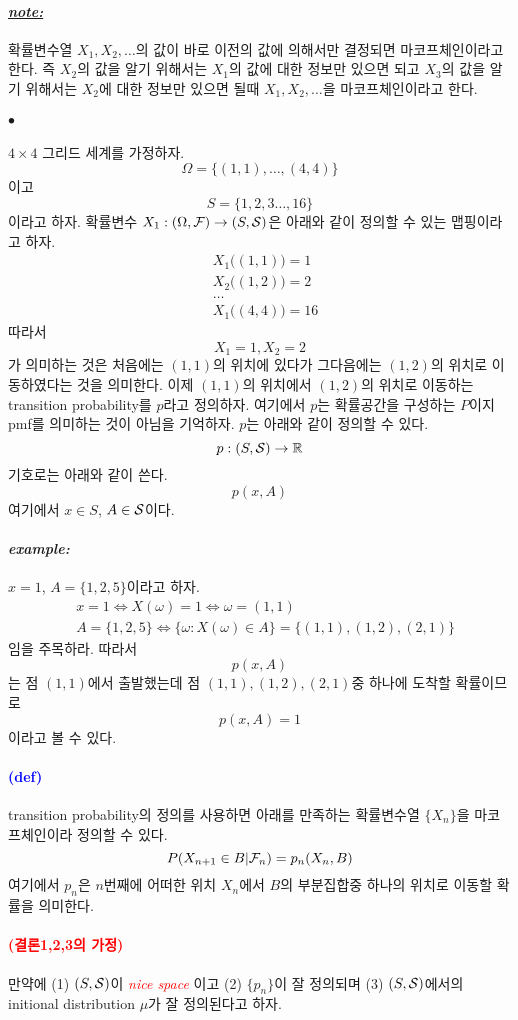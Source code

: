 \documentclass[12pt,oneside,english]{book}
\def\ck{\paragraph{\Large$\bullet$}\Large}
\def\note{\paragraph{\Large\textit{\underline{note:}}}\Large}
\def\ex{\paragraph{\Large\textit{example:}}\Large}
\newcommand{\parablue}[1]{\paragraph{\Large\textcolor{blue}{(#1)}}\Large}
\newcommand{\parared}[1]{\paragraph{\Large\textcolor{red}{(#1)}}\Large}
\begin{document}
\note 확률변수열 $X_1,X_2,\dots$의 값이 바로 이전의 값에 의해서만 결정되면 마코프체인이라고 한다. 즉 $X_2$의 값을 알기 위해서는 $X_1$의 값에 대한 정보만 있으면 되고 $X_3$의 값을 알기 위해서는 $X_2$에 대한 정보만 있으면 될때 $X_1,X_2,\dots$을 마코프체인이라고 한다. 

\ck $4\times 4$ 그리드 세계를 가정하자. 
\[
\Omega=\{(1,1),\dots,(4,4)\}
\]
이고 
\[
S=\{1,2,3\dots,16\}
\]
이라고 하자. 확률변수 $X_1:(\Omega,{\cal F}) \to (S, {\cal S})$은 아래와 같이 정의할 수 있는 맵핑이라고 하자. 
\begin{align*}
& X_1\big((1,1)\big)=1\\ 
& X_2\big((1,2))=2\\ 
& \dots \\
& X_1\big((4,4)\big)=16
\end{align*}
따라서 
\[
X_1=1, X_2=2
\]
가 의미하는 것은 처음에는 $(1,1)$의 위치에 있다가 그다음에는 $(1,2)$의 위치로 이동하였다는 것을 의미한다. 이제 $(1,1)$의 위치에서 $(1,2)$의 위치로 이동하는 transition probability를 $p$라고 정의하자. 여기에서 $p$는 확률공간을 구성하는 $P$이지 pmf를 의미하는 것이 아님을 기억하자. $p$는 아래와 같이 정의할 수 있다. 
\[
p:(S,{\cal S}) \to \mathbb{R}
\]
기호로는 아래와 같이 쓴다. 
\[
p(x,A)
\]
여기에서 $x \in S$, $A \in {\cal S}$이다. 

\ex $x=1$, $A=\{1,2,5\}$이라고 하자. 
\begin{align*}
& x=1 \Leftrightarrow X(\omega)=1 \Leftrightarrow \omega=(1,1) \\ 
& A=\{1,2,5\} \Leftrightarrow \{\omega:X(\omega) \in A\}=\{(1,1),(1,2),(2,1)\}
\end{align*}
임을 주목하라. 따라서 
\[
p(x,A)
\] 
는 점 $(1,1)$에서 출발했는데 점 $(1,1),(1,2),(2,1)$중 하나에 도착할 확률이므로 
\[
p(x,A)=1
\]
이라고 볼 수 있다. 

\parablue{def} transition probability의 정의를 사용하면 아래를 만족하는 확률변수열 $\{X_n\}$을 마코프체인이라 정의할 수 있다. 
\[
P(X_{n+1}\in B|{\cal F}_n)=p_n(X_n,B)
\]
여기에서 $p_n$은 $n$번째에 어떠한 위치 $X_n$에서 $B$의 부분집합중 하나의 위치로 이동할 확률을 의미한다. 

\parared{결론1,2,3의 가정} 만약에 (1) $(S,{\cal S})$이 \textcolor{red}{\emph{nice space}} 이고 (2) $\{p_n\}$이 잘 정의되며 (3) $(S,{\cal S})$에서의 initional distribution $\mu$가 잘 정의된다고 하자. 
\end{document}
